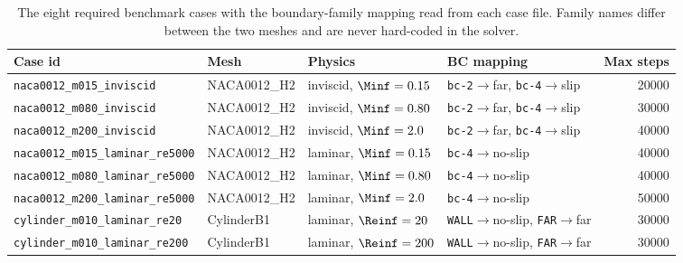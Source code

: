 \begin{table}[htbp]
  \centering
  \caption{The eight required benchmark cases with the boundary-family
  mapping read from each case file. Family names differ between the two meshes
  and are never hard-coded in the solver.}
  \label{tab:cases}
  \small
  \setlength{\tabcolsep}{3.5pt}
  \footnotesize
  \begin{tabular}{llllr}
    \toprule
    Case id & Mesh & Physics & BC mapping & Max steps \\
    \midrule
    \texttt{naca0012\_m015\_inviscid} & NACA0012\_H2 & inviscid, $\Minf=0.15$
      & \texttt{bc-2}$\to$far, \texttt{bc-4}$\to$slip & \num{20000} \\
    \texttt{naca0012\_m080\_inviscid} & NACA0012\_H2 & inviscid, $\Minf=0.80$
      & \texttt{bc-2}$\to$far, \texttt{bc-4}$\to$slip & \num{30000} \\
    \texttt{naca0012\_m200\_inviscid} & NACA0012\_H2 & inviscid, $\Minf=2.0$
      & \texttt{bc-2}$\to$far, \texttt{bc-4}$\to$slip & \num{40000} \\
    \texttt{naca0012\_m015\_laminar\_re5000} & NACA0012\_H2 & laminar, $\Minf=0.15$
      & \texttt{bc-4}$\to$no-slip & \num{40000} \\
    \texttt{naca0012\_m080\_laminar\_re5000} & NACA0012\_H2 & laminar, $\Minf=0.80$
      & \texttt{bc-4}$\to$no-slip & \num{40000} \\
    \texttt{naca0012\_m200\_laminar\_re5000} & NACA0012\_H2 & laminar, $\Minf=2.0$
      & \texttt{bc-4}$\to$no-slip & \num{50000} \\
    \texttt{cylinder\_m010\_laminar\_re20} & CylinderB1 & laminar, $\Reinf=20$
      & \texttt{WALL}$\to$no-slip, \texttt{FAR}$\to$far & \num{30000} \\
    \texttt{cylinder\_m010\_laminar\_re200} & CylinderB1 & laminar, $\Reinf=200$
      & \texttt{WALL}$\to$no-slip, \texttt{FAR}$\to$far & \num{30000} \\
    \bottomrule
  \end{tabular}
\end{table}
